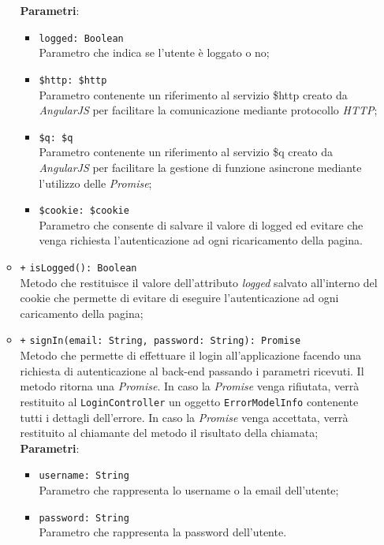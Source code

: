 \begin{itemize}
\begin{itemize}
		\textbf{Parametri}:
		\begin{itemize}
			\item \texttt{logged: Boolean} \\ Parametro che indica se l'utente è loggato o no;
			\item \texttt{\$http: \$http} \\ Parametro contenente un riferimento al servizio \$http creato da \textit{AngularJS} per facilitare la comunicazione mediante protocollo \textit{HTTP};
			\item \texttt{\$q: \$q} \\ Parametro contenente un riferimento al servizio \$q creato da \textit{AngularJS} per facilitare la gestione di funzione asincrone mediante l’utilizzo delle \textit{Promise};
			\item \texttt{\$cookie: \$cookie} \\ Parametro che consente di salvare il valore di logged ed evitare che venga richiesta l'autenticazione ad ogni ricaricamento della pagina.
		\end{itemize}
		\item \texttt{+} \texttt{isLogged(): Boolean} \\ Metodo che restituisce il valore dell'attributo \textit{logged} salvato all'interno del cookie che permette di evitare di eseguire l'autenticazione ad ogni caricamento della pagina;
		 
		\item \texttt{+} \texttt{signIn(email: String, password: String): Promise}\\ Metodo che permette di effettuare il login all'applicazione facendo una richiesta di autenticazione al back-end passando i parametri ricevuti. Il metodo ritorna una \textit{Promise}. In caso la \textit{Promise} venga rifiutata, verrà restituito al \texttt{LoginController} un oggetto \texttt{ErrorModelInfo} contenente tutti i dettagli dell'errore. In caso la \textit{Promise} venga accettata, verrà restituito al chiamante del metodo il risultato della chiamata; \\
			\textbf{Parametri}: 
			\begin{itemize}
				\item \texttt{username: String} \\ Parametro che rappresenta lo username o la email dell'utente;
				\item \texttt{password: String} \\ Parametro che rappresenta la password dell'utente.
			\end{itemize}
			

\end{itemize}
\end{itemize}
